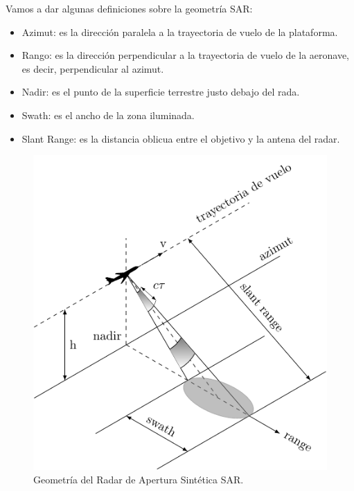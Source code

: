 Vamos a dar algunas definiciones sobre la geometría SAR:
\begin{itemize}
	\item Azimut: es la dirección paralela a la trayectoria de vuelo de la plataforma.
	\item Rango: es la dirección perpendicular a la trayectoria de vuelo de la aeronave, es decir, perpendicular al azimut.
	\item Nadir: es el punto de la superficie terrestre justo debajo del rada.
	\item Swath: es el ancho de la zona iluminada.
	\item Slant Range: es la distancia oblicua entre el objetivo y la antena del radar.
\end{itemize}

\begin{figure}[hbt]
	\centering    
	\includegraphics[scale=1]{../../Figures/Tesis/Capitulo3/sar_3d.pdf}
	\caption{\label{GeometriaSAR}Geometría del Radar de Apertura Sintética SAR.} %
\end{figure} 

